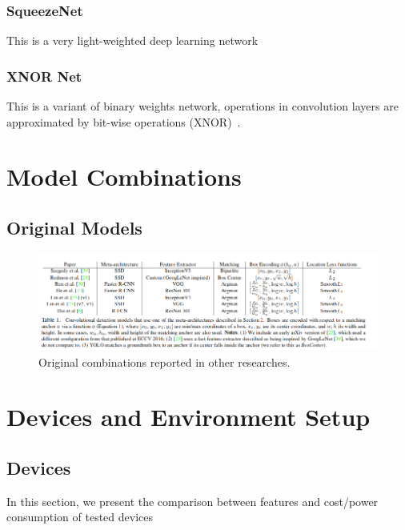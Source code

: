 \documentclass[conference]{IEEEtran}
\begin{document}
\subsubsection{SqueezeNet}
This is a very light-weighted deep learning network~\cite{shen2018cs}

\subsubsection{XNOR Net}
This is a variant of binary weights network, operations in convolution layers are approximated by bit-wise operations (XNOR)~\cite{rastegari2016xnor}.
\section{Model Combinations}

\subsection{Original Models}

\begin{figure}[htpb]
	  \centering
	  \includegraphics[width=1\textwidth]{original_models_1}
	  \caption{Original combinations reported in other researches.}
	  \label{fig:original_combinations}
\end{figure}

\section{Devices and Environment Setup}

\subsection{Devices}
In this section, we present the comparison between features and cost/power consumption of tested devices
\end{document}
